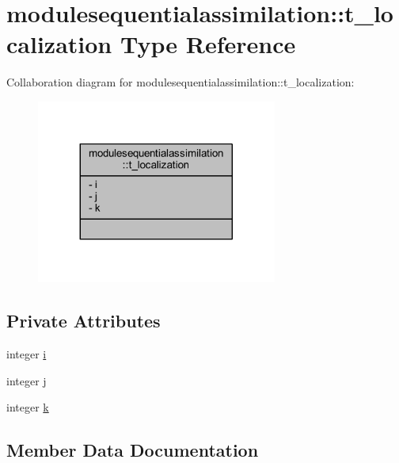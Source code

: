 \hypertarget{structmodulesequentialassimilation_1_1t__localization}{}\section{modulesequentialassimilation\+:\+:t\+\_\+localization Type Reference}
\label{structmodulesequentialassimilation_1_1t__localization}


Collaboration diagram for modulesequentialassimilation\+:\+:t\+\_\+localization\+:\nopagebreak
\begin{figure}[H]
\begin{center}
\leavevmode
\includegraphics[width=224pt]{structmodulesequentialassimilation_1_1t__localization__coll__graph}
\end{center}
\end{figure}
\subsection*{Private Attributes}
\begin{DoxyCompactItemize}
\item 
integer \mbox{\hyperlink{structmodulesequentialassimilation_1_1t__localization_a72353b0fa2929112b2c7adaeea21a7c8}{i}}
\item 
integer \mbox{\hyperlink{structmodulesequentialassimilation_1_1t__localization_affd3982014b4f01b90bcd52b084db757}{j}}
\item 
integer \mbox{\hyperlink{structmodulesequentialassimilation_1_1t__localization_a5889442b227e486f6fcd18a7f71cdf29}{k}}
\end{DoxyCompactItemize}


\subsection{Member Data Documentation}
\mbox{\label{structmodulesequentialassimilation_1_1t__localization_a72353b0fa2929112b2c7adaeea21a7c8}} 
